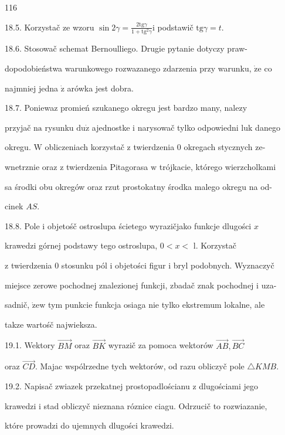 \documentclass[a4paper,12pt]{article}
\begin{document}
116

18.5. Korzystač ze wzoru $\displaystyle \sin 2\gamma=\frac{2\mathrm{t}\mathrm{g}\gamma}{1+\mathrm{t}\mathrm{g}^{2}\gamma} \mathrm{i}$ podstawič $\mathrm{t}\mathrm{g}\gamma=t.$

18.6. Stosowač schemat Bernoulliego. Drugie pytanie dotyczy praw-

dopodobieństwa warunkowego rozwazanego zdarzenia przy warunku, $\dot{\mathrm{z}}\mathrm{e}$ co

najmniej jedna $\dot{\mathrm{z}}$ arówka jest dobra.

18.7. Poniewaz promień szukanego okregu jest bardzo many, nalezy

przyjač $\mathrm{n}\mathrm{a}$ rysunku $\mathrm{d}\mathrm{u}\dot{\mathrm{z}}$ ajednostke $\mathrm{i}$ narysowač tylko odpowiedni $\mathrm{l}\mathrm{u}\mathrm{k}$ danego

okregu. $\mathrm{W}$ obliczeniach korzystač $\mathrm{z}$ twierdzenia $0$ okregach stycznych ze-

wnetrznie oraz $\mathrm{z}$ twierdzenia Pitagorasa $\mathrm{w}$ trójkacie, którego wierzcholkami

sa środki obu okregów oraz rzut prostokatny środka malego okregu na od-

cinek $AS.$

18.8. Pole $\mathrm{i}$ objetośč ostroslupa ścietego wyrazičjako funkcje dlugości $x$

krawedzi górnej podstawy tego ostroslupa, $0 < x <$ l. Korzystač

$\mathrm{z}$ twierdzenia $0$ stosunku pól $\mathrm{i}$ objetości figur $\mathrm{i}$ bryl podobnych. Wyznaczyč

miejsce zerowe pochodnej znalezionej funkcji, zbadač znak pochodnej $\mathrm{i}$ uza-

sadnič, $\dot{\mathrm{z}}\mathrm{e}\mathrm{w}$ tym punkcie funkcja osiaga nie tylko ekstremum lokalne, ale

takze wartośč najwieksza.

19.1. Wektory $\vec{BM}$ oraz $\vec{BK}$ wyrazič za pomoca wektorów $\vec{AB}, \vec{BC}$

oraz $\vec{CD}$. Majac wspólrzedne tych wektorów, od razu obliczyč pole $\triangle KMB.$

19.2. Napisač zwiazek przekatnej prostopadlościanu $\mathrm{z}$ dlugościami jego

krawedzi $\mathrm{i}$ stad obliczyč nieznana róznice ciagu. Odrzucič to rozwiazanie,

które prowadzi do ujemnych dlugości krawedzi.
\end{document}

